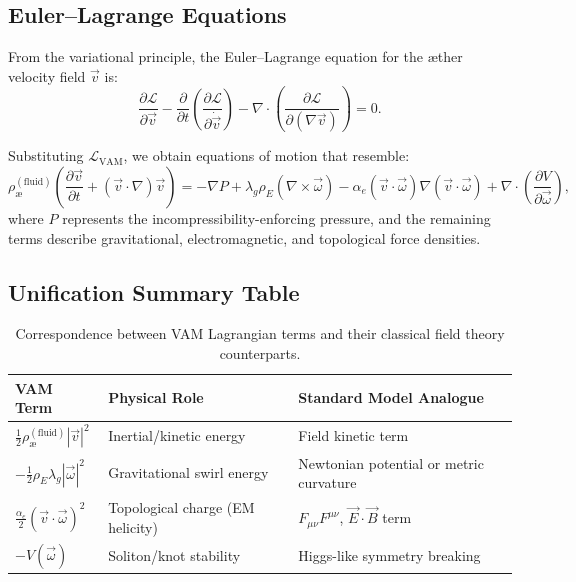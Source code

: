 \subsection{Euler--Lagrange Equations}

From the variational principle, the Euler--Lagrange equation for the \ae{}ther velocity field $\vec{v}$ is:
\begin{equation}
\frac{\partial \mathcal{L}}{\partial \vec{v}}
- \frac{\partial}{\partial t} \left( \frac{\partial \mathcal{L}}{\partial \dot{\vec{v}}} \right)
- \nabla \cdot \left( \frac{\partial \mathcal{L}}{\partial (\nabla \vec{v})} \right) = 0.
\end{equation}

Substituting $\mathcal{L}_{\text{VAM}}$, we obtain equations of motion that resemble:
\begin{equation}
\rho_\text{\ae}^{(\text{fluid})} \left( \frac{\partial \vec{v}}{\partial t} + (\vec{v} \cdot \nabla)\vec{v} \right)
= - \nabla P
+ \lambda_g \rho_{\scriptscriptstyle\boldsymbol\!E}(\nabla \times \vec{\omega})
- \alpha_e (\vec{v} \cdot \vec{\omega}) \nabla (\vec{v} \cdot \vec{\omega})
+ \nabla \cdot \left( \frac{\partial V}{\partial \vec{\omega}} \right),
\end{equation}
where $P$ represents the incompressibility-enforcing pressure, and the remaining terms describe gravitational, electromagnetic, and topological force densities.

\subsection{Unification Summary Table}

\begin{table}[H]
\centering
\renewcommand{\arraystretch}{1.3}
\begin{tabular}{|l|l|l|}
\hline
\textbf{VAM Term} & \textbf{Physical Role} & \textbf{Standard Model Analogue} \\
\hline
$\frac{1}{2} \rho_\text{\ae}^{(\text{fluid})} |\vec{v}|^2$ & Inertial/kinetic energy & Field kinetic term \\
$-\frac{1}{2} \rho_{\scriptscriptstyle\boldsymbol\!E}\lambda_g |\vec{\omega}|^2$ & Gravitational swirl energy & Newtonian potential or metric curvature \\
$\frac{\alpha_e}{2} (\vec{v} \cdot \vec{\omega})^2$ & Topological charge (EM helicity) & $F_{\mu\nu}F^{\mu\nu}$, $\vec{E}\cdot\vec{B}$ term \\
$-V(\vec{\omega})$ & Soliton/knot stability & Higgs-like symmetry breaking \\
\hline
\end{tabular}
\caption{Correspondence between VAM Lagrangian terms and their classical field theory counterparts.}
\end{table}